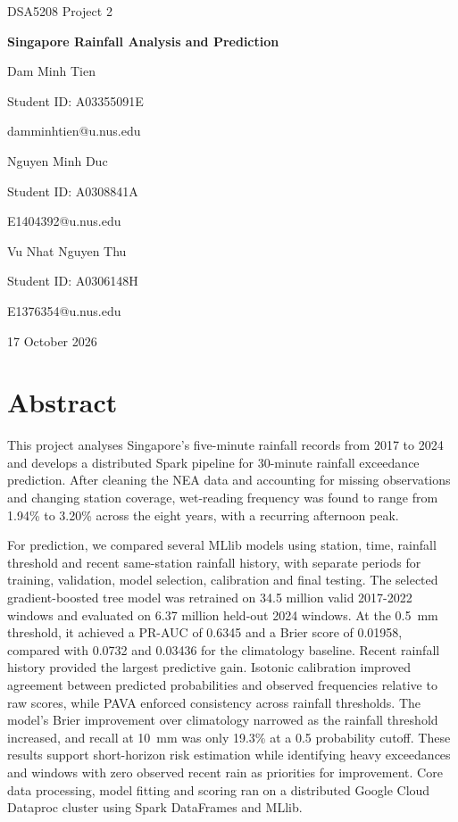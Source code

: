 \documentclass[11pt,a4paper]{article}
\newcommand{\projecttitle}{Singapore Rainfall Analysis and Prediction}
\begin{document}
\hypersetup{pageanchor=false}
\begin{titlepage}
  \centering
  \vspace*{35mm}
  {\Large DSA5208 Project 2\par}
  \vspace{10mm}
  {\LARGE\bfseries \projecttitle\par}
  \vfill
  {\large Dam Minh Tien\par}
  {\normalsize Student ID: A03355091E\par}
  {\normalsize damminhtien@u.nus.edu\par}
  \vspace{4mm}
  {\large Nguyen Minh Duc\par}
  {\normalsize Student ID: A0308841A\par}
  {\normalsize E1404392@u.nus.edu\par}
  \vspace{4mm}
  {\large Vu Nhat Nguyen Thu\par}
  {\normalsize Student ID: A0306148H\par}
  {\normalsize E1376354@u.nus.edu\par}
  \vspace{10mm}
  {\large 17 October 2026\par}
\end{titlepage}

\hypersetup{pageanchor=true}
\section*{Abstract}
This project analyses Singapore's five-minute rainfall records from 2017 to
2024 and develops a distributed Spark pipeline for 30-minute rainfall
exceedance prediction. After cleaning the NEA data and accounting for missing
observations and changing station coverage, wet-reading frequency was found to
range from 1.94\% to 3.20\% across the eight years, with a recurring afternoon
peak.

For prediction, we compared several MLlib models using station, time, rainfall
threshold and recent same-station rainfall history, with separate periods for
training, validation, model selection, calibration and final testing. The
selected gradient-boosted tree model was retrained on 34.5 million valid
2017-2022 windows and evaluated on 6.37 million held-out 2024 windows. At the
0.5~mm threshold, it achieved a PR-AUC of 0.6345 and a Brier score of 0.01958,
compared with 0.0732 and 0.03436 for the climatology baseline. Recent rainfall
history provided the largest predictive gain. Isotonic calibration improved
agreement between predicted probabilities and observed frequencies relative
to raw scores, while PAVA enforced consistency across rainfall thresholds.
The model's Brier improvement over climatology narrowed as the rainfall
threshold increased, and recall at 10~mm was only 19.3\% at a 0.5 probability
cutoff. These results support short-horizon risk estimation while identifying
heavy exceedances and windows with zero observed recent rain as priorities
for improvement. Core data processing, model fitting and scoring ran on a
distributed Google Cloud Dataproc cluster using Spark DataFrames and MLlib.
\end{document}
